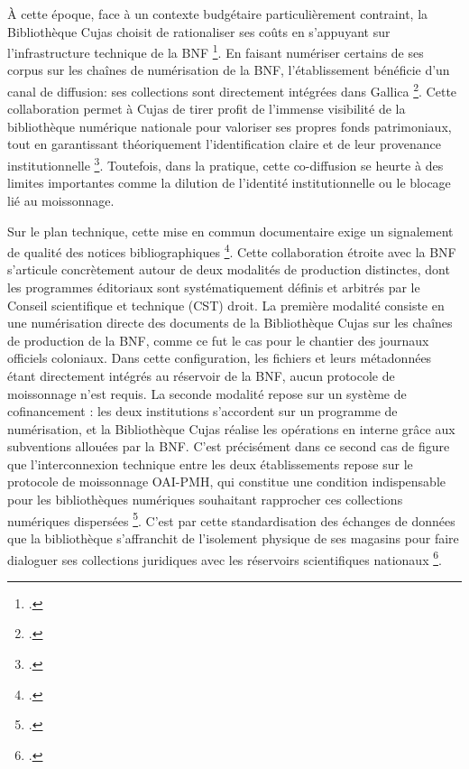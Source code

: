 À cette époque, face à un contexte budgétaire particulièrement contraint, la Bibliothèque Cujas choisit de rationaliser ses coûts en s'appuyant sur l'infrastructure technique  de la \ac{BNF} \footcite{2007RefonteProgramme}. En faisant numériser certains de ses corpus sur les chaînes de numérisation de la \ac{BNF}, l'établissement bénéficie d'un canal de diffusion: ses collections sont directement intégrées dans Gallica \footcite{Arabesques_69_12_dossier_balleypdfEspaceTravail}. Cette collaboration permet à Cujas de tirer profit de l'immense visibilité de la bibliothèque numérique nationale pour valoriser ses propres fonds patrimoniaux, tout en garantissant théoriquement l'identification claire et de leur provenance institutionnelle \footcite{ProgrammeNationalNumerisation}. Toutefois, dans la pratique, cette co-diffusion se heurte à des limites importantes comme la dilution de l'identité institutionnelle ou le blocage lié au moissonnage.

Sur le plan technique, cette mise en commun documentaire exige un signalement de qualité des notices bibliographiques \footcite{coudrinDispositifsSignalementUniversite2014}. Cette collaboration étroite avec la \ac{BNF} s'articule concrètement autour de deux modalités de production distinctes, dont les programmes éditoriaux sont systématiquement définis et arbitrés par le Conseil scientifique et technique (CST) droit. La première modalité consiste en une numérisation directe des documents de la Bibliothèque Cujas sur les chaînes de production de la \ac{BNF}, comme ce fut le cas pour le chantier des journaux officiels coloniaux. Dans cette configuration, les fichiers et leurs métadonnées étant directement intégrés au réservoir de la \ac{BNF}, aucun protocole de moissonnage n'est requis. La seconde modalité repose sur un système de cofinancement : les deux institutions s'accordent sur un programme de numérisation, et la Bibliothèque Cujas réalise les opérations en interne grâce aux subventions allouées par la \ac{BNF}. C'est précisément dans ce second cas de figure que l'interconnexion technique entre les deux établissements repose sur le protocole de moissonnage \ac{OAI-PMH}, qui constitue une condition indispensable pour les bibliothèques numériques souhaitant rapprocher ces collections numériques dispersées \footcite{gauthierProtocoleOAIPMHFonctionnalitesa}. C'est par cette standardisation des échanges de données que la bibliothèque s'affranchit de l'isolement physique de ses magasins pour faire dialoguer ses collections juridiques avec les réservoirs scientifiques nationaux \footcite{stutzmannSignalerRessourcesNumerisees2013}.

